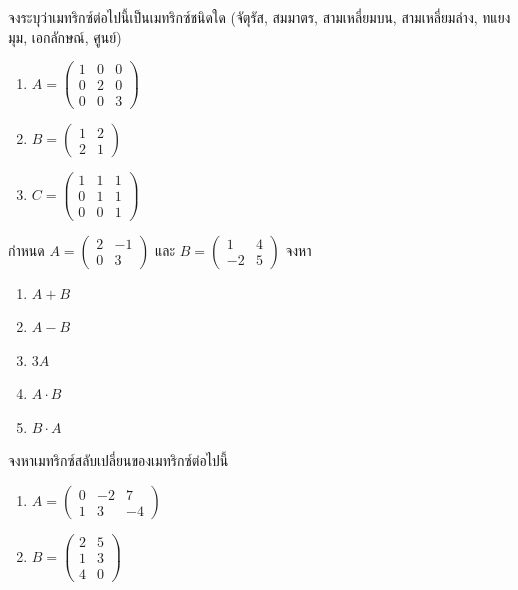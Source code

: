 \begin{exercise}
จงระบุว่าเมทริกซ์ต่อไปนี้เป็นเมทริกซ์ชนิดใด (จัตุรัส, สมมาตร, สามเหลี่ยมบน, สามเหลี่ยมล่าง, ทแยงมุม, เอกลักษณ์, ศูนย์)
\begin{enumerate}
    \item $A = \begin{pmatrix} 1 & 0 & 0 \\ 0 & 2 & 0 \\ 0 & 0 & 3 \end{pmatrix}$
    \item $B = \begin{pmatrix} 1 & 2 \\ 2 & 1 \end{pmatrix}$
    \item $C = \begin{pmatrix} 1 & 1 & 1 \\ 0 & 1 & 1 \\ 0 & 0 & 1 \end{pmatrix}$
\end{enumerate}
\end{exercise}

\begin{exercise}
กำหนด $A = \begin{pmatrix} 2 & -1 \\ 0 & 3 \end{pmatrix}$ และ $B = \begin{pmatrix} 1 & 4 \\ -2 & 5 \end{pmatrix}$ จงหา
\begin{enumerate}
    \item $A + B$
    \item $A - B$
    \item $3A$
    \item $A \cdot B$
    \item $B \cdot A$
\end{enumerate}
\end{exercise}

\begin{exercise}
จงหาเมทริกซ์สลับเปลี่ยนของเมทริกซ์ต่อไปนี้
\begin{enumerate}
    \item $A = \begin{pmatrix} 0 & -2 & 7 \\ 1 & 3 & -4 \end{pmatrix}$
    \item $B = \begin{pmatrix} 2 & 5 \\ 1 & 3 \\ 4 & 0 \end{pmatrix}$
\end{enumerate}
\end{exercise}

